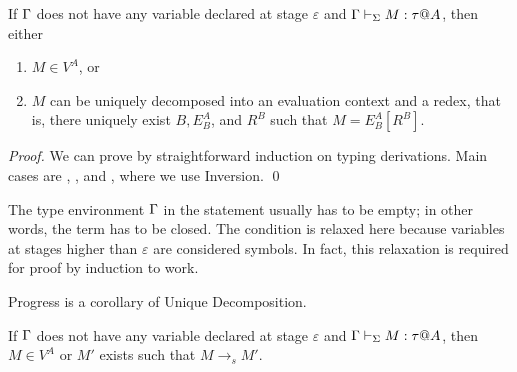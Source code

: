 \begin{theorem}
  If $\Gamma$ does not have any variable declared at stage $\varepsilon$ 
  and $\Gamma \vdash_\Sigma M : \tau @ A$, then either
  \begin{enumerate}
  \item $ M \in V^A$, or
  \item $M$ can be uniquely decomposed into an evaluation context and a redex, that is, there uniquely exist $B, E^A_B$, and $R^B$ such that $M = E^A_B[R^B]$.
  \end{enumerate}
\end{theorem}

\begin{proof}
  We can prove by straightforward induction on typing derivations.
  Main cases are \TApp, \TTBL, and \TIns, where we use Inversion.
  \qed
\end{proof}

The type environment $\Gamma$ in the statement usually has to be empty;
in other words, the term has to be closed.  The condition is relaxed here
because variables at stages higher than \(\varepsilon\) are considered
symbols.  In fact, this relaxation is required for proof by induction
to work.

      
Progress is a corollary of Unique Decomposition.

\begin{corollary}[Progress]
	If $\Gamma$ does not have any variable declared at stage $\varepsilon$ and $\Gamma \vdash_\Sigma M : \tau  @ A$, then
	$ M \in V^A $ or $M'$ exists such that $M \longrightarrow_s M'$.
\end{corollary}

